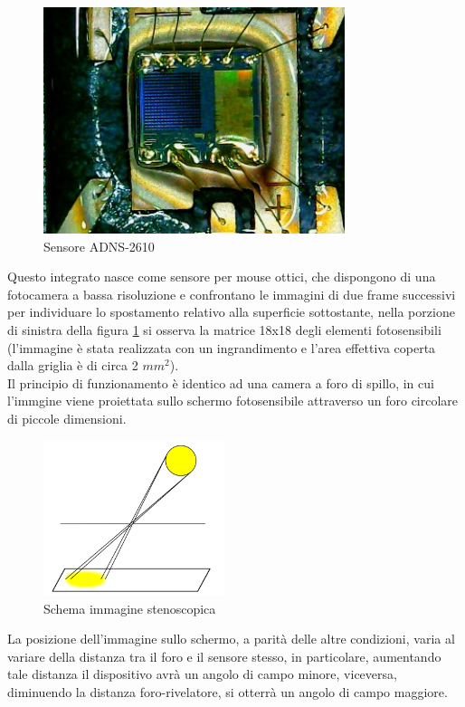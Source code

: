 \documentclass[12pt]{article}
\begin{document}
    \begin{figure}[h]
        \centering
        \includegraphics[width=250pt]{Draws/ADNS-2610_die/WIN_20210501_17_42_53_Pro.jpg}
        \caption{Sensore ADNS-2610}
        \label{fig:ADNS2610_die}
    \end{figure}
   
    \noindent
    Questo integrato nasce come sensore per mouse ottici, che dispongono di una fotocamera a bassa risoluzione e confrontano le immagini di due frame successivi per individuare lo spostamento relativo alla superficie sottostante, nella porzione di sinistra della figura \ref{fig:ADNS2610_die} si osserva la matrice 18x18 degli elementi fotosensibili (l'immagine è stata realizzata con un ingrandimento e l'area effettiva coperta dalla griglia è di circa 2 $mm^2$).\\
    Il principio di funzionamento è identico ad una camera a foro di spillo, in cui l'immgine viene proiettata sullo schermo fotosensibile attraverso un foro circolare di piccole dimensioni.
    
    \begin{figure}[h]
        \centering
        \includegraphics[width=150pt]{Draws/Pinhole_sun}
        \caption{Schema immagine stenoscopica}
        \label{fig:pinhole_sun}
    \end{figure}
    
    \noindent
    La posizione dell'immagine sullo schermo, a parità delle altre condizioni, varia al variare della distanza tra il foro e il sensore stesso, in particolare, aumentando tale distanza il dispositivo avrà un angolo di campo minore, viceversa, diminuendo la distanza foro-rivelatore, si otterrà un angolo di campo maggiore.
    
\end{document}
